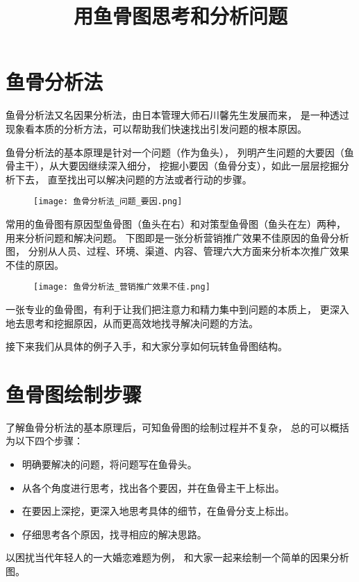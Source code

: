 \documentclass[../main.tex]{subfiles}
\title{用鱼骨图思考和分析问题}
\begin{document}
\maketitle
%
\section{鱼骨分析法}
鱼骨分析法又名因果分析法，由日本管理大师石川馨先生发展而来，
是一种透过现象看本质的分析方法，可以帮助我们快速找出引发问题的根本原因。

鱼骨分析法的基本原理是针对一个问题（作为鱼头），
列明产生问题的大要因（鱼骨主干），从大要因继续深入细分，
挖掘小要因（鱼骨分支），如此一层层挖掘分析下去，
直至找出可以解决问题的方法或者行动的步骤。
%
\begin{figure}[H]
  \begin{center}
    \texttt{[image: 鱼骨分析法\_问题\_要因.png]}
  \end{center}
\end{figure}
%
常用的鱼骨图有原因型鱼骨图（鱼头在右）和对策型鱼骨图（鱼头在左）两种，
用来分析问题和解决问题。
下图即是一张分析营销推广效果不佳原因的鱼骨分析图，
分别从人员、过程、环境、渠道、内容、管理六大方面来分析本次推广效果不佳的原因。
%
\begin{figure}[H]
  \begin{center}
    \texttt{[image: 鱼骨分析法\_营销推广效果不佳.png]}
  \end{center}
\end{figure}
一张专业的鱼骨图，有利于让我们把注意力和精力集中到问题的本质上，
更深入地去思考和挖掘原因，从而更高效地找寻解决问题的方法。

接下来我们从具体的例子入手，和大家分享如何玩转鱼骨图结构。
%
\section{鱼骨图绘制步骤}
了解鱼骨分析法的基本原理后，可知鱼骨图的绘制过程并不复杂，
总的可以概括为以下四个步骤：
%
\begin{itemize}
  \item 明确要解决的问题，将问题写在鱼骨头。
  \item 从各个角度进行思考，找出各个要因，并在鱼骨主干上标出。
  \item 在要因上深挖，更深入地思考具体的细节，在鱼骨分支上标出。
  \item 仔细思考各个原因，找寻相应的解决思路。
\end{itemize}
%
以困扰当代年轻人的一大婚恋难题为例，
和大家一起来绘制一个简单的因果分析图。
\end{document}
